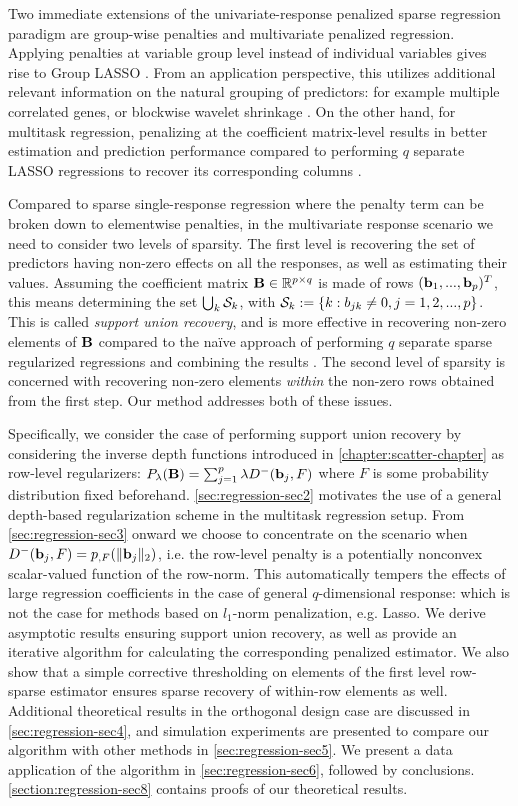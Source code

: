 Two immediate extensions of the univariate-response penalized sparse regression paradigm are group-wise penalties and multivariate penalized regression. Applying penalties at variable group level instead of individual variables gives rise to Group LASSO \citep{BakinThesis99}. From an application perspective, this utilizes additional relevant information on the natural grouping of predictors: for example multiple correlated genes, or blockwise wavelet shrinkage \citep{AntoniadisFan01}. On the other hand, for multitask regression, penalizing at the coefficient matrix-level results in better estimation and prediction performance compared to performing $q$ separate LASSO regressions to recover its corresponding columns \citep{RothmanEtal10}.

Compared to sparse single-response regression where the penalty term can be broken down to elementwise penalties, in the multivariate response  scenario we need to consider two levels of sparsity. The first level is recovering the set of predictors having non-zero effects on all the responses, as well as estimating their values. Assuming the coefficient matrix ${\mathbf{B}} \in \mathbb R^{p \times q}$ is made of rows $({\bf{b}}_1,...,{\bf{b}}_p)^T$, this means determining the set $\bigcup_k {\cal{S}}_k$, with ${\cal{S}}_k := \{ k: b_{jk} \neq 0, j = 1, 2, ..., p \}$.  This is called \textit{support union recovery}, and is more effective in recovering non-zero elements of ${\mathbf{B}}$ compared to the na\"ive approach of performing $q$ separate sparse regularized regressions and combining the results \citep{ObozinskiEtal11}. The second level of sparsity is concerned with recovering non-zero elements \textit{within} the non-zero rows obtained from the first step. Our method addresses both of these issues.

Specifically, we consider the case of performing support union recovery by considering the inverse depth functions introduced in \ref{chapter:scatter-chapter} as row-level regularizers: $P_\lambda({\mathbf{B}}) = \sum_{j=1}^p \lambda D^- ({\bf{b}}_j, F)$ where $F$ is some probability distribution fixed beforehand. \ref{sec:regression-sec2} motivates the use of a general depth-based regularization scheme in the multitask regression setup. From \ref{sec:regression-sec3} onward we choose to concentrate on the scenario when $D^- ({\bf{b}}_j, F) = p_{,F} (\|{\bf{b}}_j\|_2)$, i.e. the row-level penalty is a potentially nonconvex scalar-valued function of the row-norm. This automatically tempers the effects of large regression coefficients in the case of general  $q$-dimensional response: which is not the case for methods based on $l_1$-norm penalization, e.g. Lasso. We derive asymptotic results ensuring support union recovery, as well as provide an iterative algorithm for calculating the corresponding penalized estimator. We also show that a simple corrective thresholding on elements of the first level row-sparse estimator ensures sparse recovery of within-row elements as well. Additional theoretical results in the orthogonal design case are discussed in \ref{sec:regression-sec4}, and simulation experiments are presented to compare our algorithm with other methods in \ref{sec:regression-sec5}. We present a data application of the algorithm in \ref{sec:regression-sec6}, followed by conclusions. \ref{section:regression-sec8} contains proofs of our theoretical results.